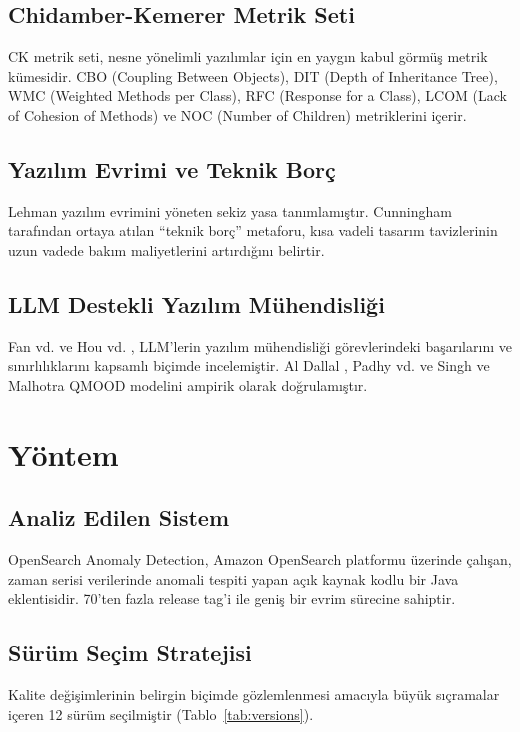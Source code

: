 \documentclass[conference]{IEEEtran}
\begin{document}
\subsection{Chidamber-Kemerer Metrik Seti}
CK \cite{chidamber1994} metrik seti, nesne y\"onelimli yaz{\i}l{\i}mlar i\c{c}in en yayg{\i}n kabul g\"orm\"u\c{s} metrik k\"umesidir. CBO (Coupling Between Objects), DIT (Depth of Inheritance Tree), WMC (Weighted Methods per Class), RFC (Response for a Class), LCOM (Lack of Cohesion of Methods) ve NOC (Number of Children) metriklerini i\c{c}erir.

\subsection{Yaz{\i}l{\i}m Evrimi ve Teknik Bor\c{c}}
Lehman \cite{lehman1996} yaz{\i}l{\i}m evrimini y\"oneten sekiz yasa tan{\i}mlam{\i}\c{s}t{\i}r. Cunningham \cite{cunningham1992} taraf{\i}ndan ortaya at{\i}lan ``teknik bor\c{c}'' metaforu, k{\i}sa vadeli tasar{\i}m tavizlerinin uzun vadede bak{\i}m maliyetlerini art{\i}rd{\i}\u{g}{\i}n{\i} belirtir.

\subsection{LLM Destekli Yaz{\i}l{\i}m M\"uhendisli\u{g}i}
Fan vd. \cite{fan2023} ve Hou vd. \cite{hou2024}, LLM'lerin yaz{\i}l{\i}m m\"uhendisli\u{g}i g\"orevlerindeki ba\c{s}ar{\i}lar{\i}n{\i} ve s{\i}n{\i}rl{\i}l{\i}klar{\i}n{\i} kapsaml{\i} bi\c{c}imde incelemi\c{s}tir. Al Dallal \cite{aldallal2013}, Padhy vd. \cite{padhy2018} ve Singh ve Malhotra \cite{singh2022} QMOOD modelini ampirik olarak do\u{g}rulam{\i}\c{s}t{\i}r.

\section{Y\"ontem}

\subsection{Analiz Edilen Sistem}
OpenSearch Anomaly Detection, Amazon OpenSearch platformu \"uzerinde \c{c}al{\i}\c{s}an, zaman serisi verilerinde anomali tespiti yapan a\c{c}{\i}k kaynak kodlu bir Java eklentisidir. 70'ten fazla release tag'i ile geni\c{s} bir evrim s\"urecine sahiptir.

\subsection{S\"ur\"um Se\c{c}im Stratejisi}
Kalite de\u{g}i\c{s}imlerinin belirgin bi\c{c}imde g\"ozlemlenmesi amac{\i}yla b\"uy\"uk s{\i}\c{c}ramalar i\c{c}eren 12 s\"ur\"um se\c{c}ilmi\c{s}tir (Tablo~\ref{tab:versions}).
\end{document}
